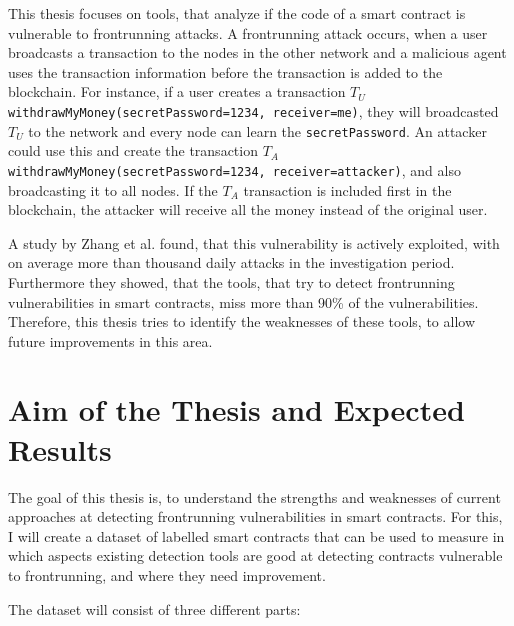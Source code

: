 \documentclass[paper=a4,fontsize=11pt,oneside,titlepage]{scrartcl}
\begin{document}
This thesis focuses on tools, that analyze if the code of a smart contract is vulnerable to frontrunning attacks. A frontrunning attack occurs, when a user broadcasts a transaction to the nodes in the other network and a malicious agent uses the transaction information before the transaction is added to the blockchain. For instance, if a user creates a transaction $T{_U}$ \verb|withdrawMyMoney(secretPassword=1234, receiver=me)|, they will broadcasted $T_{U}$ to the network and every node can learn the \verb|secretPassword|. An attacker could use this and create the transaction $T_A$ \\ \verb|withdrawMyMoney(secretPassword=1234, receiver=attacker)|, and also broadcasting it to all nodes. If the $T_A$ transaction is included first in the blockchain, the attacker will receive all the money instead of the original user.

A study by Zhang et al. \cite{zhang_combatting_2023} found, that this vulnerability is actively exploited, with on average more than thousand daily attacks in the investigation period. Furthermore they showed, that the tools, that try to detect frontrunning vulnerabilities in smart contracts, miss more than 90\% of the vulnerabilities. Therefore, this thesis tries to identify the weaknesses of these tools, to allow future improvements in this area.

\iffalse
\begin{itemize}
\item What is the problem to be studied? Why is it important?
\item Ethical considerations (if any)
\end{itemize}
\fi

\section{Aim of the Thesis and Expected Results}
\label{sec:results}

The goal of this thesis is, to understand the strengths and weaknesses of current approaches at detecting frontrunning vulnerabilities in smart contracts. For this, I will create a dataset of labelled smart contracts that can be used to measure in which aspects existing detection tools are good at detecting contracts vulnerable to frontrunning, and where they need improvement.

The dataset will consist of three different parts:
\end{document}
